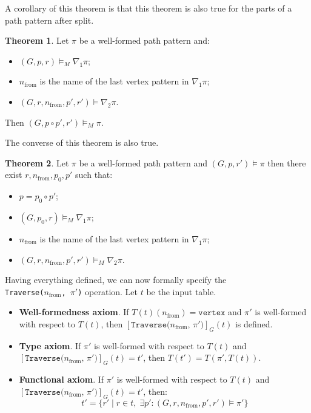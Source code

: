 \documentclass[14pt]{constructor-thesis}
\theoremstyle{definition}
\newtheorem{theorem}{Theorem}
\begin{document}
A corollary of this theorem is that this theorem is also true for the parts of a path pattern after split.

\begin{theorem}
  Let $\pi$ be a well-formed path pattern and:
  \begin{itemize}
    \item $(G, p, r) \models_M \nabla_1 \pi$;
    \item $n_{\mathrm{from}}$ is the name of the last vertex pattern in $\nabla_1 \pi$;
    \item $(G, r, n_{\mathrm{from}}, p', r') \models \nabla_2 \pi$.
  \end{itemize}
  Then $(G, p \circ p', r') \models_M \pi$.
\end{theorem}

The converse of this theorem is also true.

\begin{theorem}
  Let $\pi$ be a well-formed path pattern and $(G, p, r') \models \pi$ then there exist $r, n_{\mathrm{from}}, p_0, p'$ such that:
  \begin{itemize}
    \item $p = p_0 \circ p'$;
    \item $(G, p_0, r) \models_M \nabla_1 \pi$;
    \item $n_{\mathrm{from}}$ is the name of the last vertex pattern in $\nabla_1 \pi$;
    \item $(G, r, n_{\mathrm{from}}, p', r') \models_M \nabla_2 \pi$.
  \end{itemize}
\end{theorem}

Having everything defined, we can now formally specify the \\ \texttt{Traverse($n_{\mathrm{from}}$, $\pi'$)} operation. Let $t$ be the input table.
\begin{itemize}
  \item \textbf{Well-formedness axiom}. If $T(t)(n_{\mathrm{from}}) = \texttt{vertex}$ and $\pi'$ is well-formed with respect to $T(t)$, then $[\texttt{Traverse($n_{\mathrm{from}}$, $\pi'$)}]_G(t)$ is defined.
  
  \item \textbf{Type axiom}. If $\pi'$ is well-formed with respect to $T(t)$ and \\ $[\texttt{Traverse($n_{\mathrm{from}}$, $\pi'$)}]_G(t) = t'$, then $T(t') = T(\pi', T(t))$.

  \item \textbf{Functional axiom}. If $\pi'$ is well-formed with respect to $T(t)$ and \\ $[\texttt{Traverse($n_{\mathrm{from}}$, $\pi'$)}]_G(t) = t'$, then:
  $$ t' = \{ r' \mid r \in t, \; \exists p' : (G, r, n_{\mathrm{from}}, p', r') \models \pi' \} $$
\end{itemize}
\end{document}
